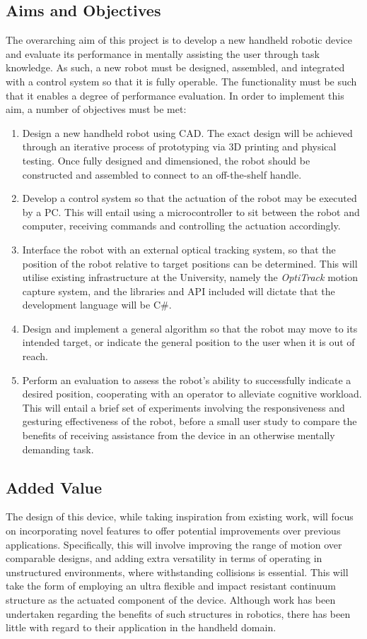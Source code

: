 \documentclass[11pt]{article}
\begin{document}
\subsection{Aims and Objectives}
The overarching aim of this project is to develop a new handheld robotic device and evaluate its performance in mentally assisting the user through task knowledge. As such, a new robot must be designed, assembled, and integrated with a control system so that it is fully operable. The functionality must be such that it enables a degree of performance evaluation. In order to implement this aim, a number of objectives must be met:
\begin{enumerate}
\item{Design a new handheld robot using CAD. The exact design will be achieved through an iterative process of prototyping via 3D printing and physical testing. Once fully designed and dimensioned, the robot should be constructed and assembled to connect to an off-the-shelf handle.}
\item{Develop a control system so that the actuation of the robot may be executed by a PC. This will entail using a microcontroller to sit between the robot and computer, receiving commands and controlling the actuation accordingly.}
\item{Interface the robot with an external optical tracking system, so that the position of the robot relative to target positions can be determined. This will utilise existing infrastructure at the University, namely the \textit{OptiTrack} motion capture system, and the libraries and API included will dictate that the development language will be C\#.}
\item{Design and implement a general algorithm so that the robot may move to its intended target, or indicate the general position to the user when it is out of reach.}
\item{Perform an evaluation to assess the robot's ability to successfully indicate a desired position, cooperating with an operator to alleviate cognitive workload. This will entail a brief set of experiments involving the responsiveness and gesturing effectiveness of the robot, before a small user study to compare the benefits of receiving assistance from the device in an otherwise mentally demanding task.}
\end{enumerate}

\subsection{Added Value}
The design of this device, while taking inspiration from existing work, will focus on incorporating novel features to offer potential improvements over previous applications. Specifically, this will involve improving the range of motion over comparable designs, and adding extra versatility in terms of operating in unstructured environments, where withstanding collisions is essential. This will take the form of employing an ultra flexible and impact resistant continuum structure as the actuated component of the device. Although work has been undertaken regarding the benefits of such structures in robotics, there has been little with regard to their application in the handheld domain.
\end{document}
